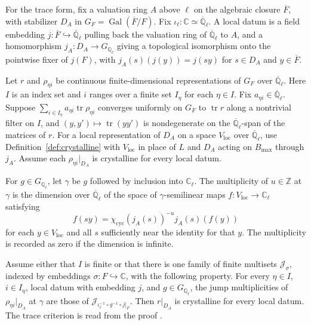 \documentclass[reqno]{amsart}
\theoremstyle{definition}
\theoremstyle{plain}
\theoremstyle{remark}
\newcommand{\Z}{\mathbb Z}
\newcommand{\Q}{\mathbb Q}
\newcommand{\C}{\mathbb C}
\newcommand{\Bmax}{B_{\max}}
\begin{document}
For the trace form, fix a valuation ring \(A\) above \(\ell\) on the
algebraic closure \(\overline F\), with stabilizer \(D_A\) in
\(G_F=\operatorname{Gal}(\overline F/F)\). Fix
\(\iota_\ell\colon\C\simeq\overline{\Q}_\ell\).
A local datum is a field embedding \(j\colon\overline F\hookrightarrow
\overline{\Q}_\ell\) pulling back the valuation ring of
\(\overline{\Q}_\ell\) to \(A\), and a homomorphism
\(j_A\colon D_A\to G_{\Q_\ell}\) giving a topological isomorphism onto
the pointwise fixer of \(j(F)\), with \(j_A(s)(j(y))=j(sy)\) for \(s\in D_A\)
and \(y\in\overline F\).

Let \(r\) and \(\rho_{\eta i}\) be continuous finite-dimensional
representations of \(G_F\) over \(\overline{\Q}_\ell\). Here \(I\) is an
index set and \(i\) ranges over a finite set \(I_\eta\) for each
\(\eta\in I\). Fix
\(a_{\eta i}\in\overline{\Q}_\ell\). Suppose
\(\sum_{i\in I_\eta}a_{\eta i}\operatorname{tr}\rho_{\eta i}\)
converges uniformly on \(G_F\) to \(\operatorname{tr}r\) along a
nontrivial filter on \(I\), and \((y,y')\mapsto\operatorname{tr}(yy')\)
is nondegenerate on the \(\overline{\Q}_\ell\)-span of the matrices of \(r\).
For a local representation of \(D_A\) on a space \(V_{\mathrm{loc}}\) over
\(\overline{\Q}_\ell\), use Definition~\ref{def:crystalline} with \(V_{\mathrm{loc}}\)
in place of \(L\) and \(D_A\) acting on \(\Bmax\) through \(j_A\).
Assume each \(\rho_{\eta i}|_{D_A}\) is crystalline for every local datum.

For \(g\in G_{\Q_\ell}\), let \(\gamma\) be \(g\) followed by inclusion
into \(\C_\ell\). The multiplicity of \(u\in\Z\) at \(\gamma\) is the
dimension over \(\overline{\Q}_\ell\) of the space of \(\gamma\)-semilinear
maps \(f\colon V_{\mathrm{loc}}\to\C_\ell\) satisfying
\[
 f(sy)=\chi_{\mathrm{cyc}}(j_A(s))^{-u}j_A(s)(f(y))
\]
for each \(y\in V_{\mathrm{loc}}\) and all \(s\) sufficiently near the identity for that \(y\).
The multiplicity is recorded as zero if the dimension is infinite.

Assume either that \(I\) is finite or that there is one family of finite
multisets \(\mathcal J_\sigma\), indexed by embeddings \(\sigma\colon F\hookrightarrow\C\),
with the following property. For every \(\eta\in I\), \(i\in I_\eta\),
local datum with embedding \(j\), and \(g\in G_{\Q_\ell}\), the jump
multiplicities of \(\rho_{\eta i}|_{D_A}\) at \(\gamma\) are those of
\(\mathcal J_{\iota_\ell^{-1}\circ g^{-1}\circ j|_F}\).
Then \(r|_{D_A}\) is crystalline for every local datum. The trace
criterion is read from the proof \cite{GL}.
\end{document}
